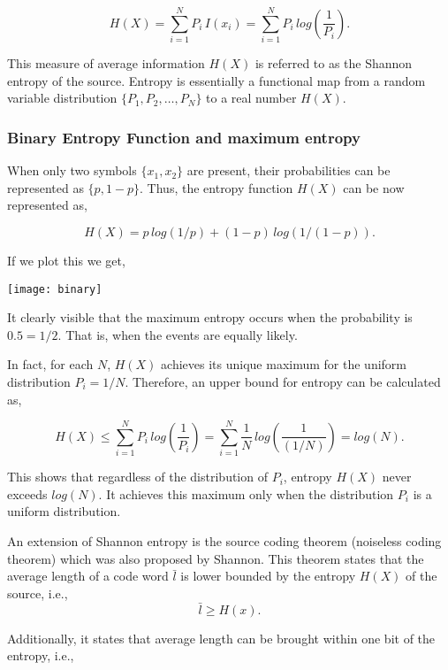 \documentclass[]{article}
\begin{document}
$$H(X) = \sum_{i=1}^{N}P_i\hspace{2pt}I(x_i) = \sum_{i=1}^{N}P_i\hspace{2pt}log\left(\frac{1}{P_i}\right). $$

This measure of average information $H(X)$ is referred to as the Shannon entropy of the source. Entropy is essentially a functional map from a random variable distribution $\{P_1,P_2,\dots,P_N\}$ to a real number $H(X)$. 

\subsubsection*{Binary Entropy Function and maximum entropy}

When only two symbols $\{x_1,x_2\}$ are present, their probabilities can be represented as $\{p,1-p\}$. Thus, the entropy function $H(X)$ can be now represented as,

$$H(X) = p\hspace{2pt}log(1/p)+(1-p)\hspace{2pt}log(1/(1-p)).$$

If we plot this we get,

\begin{center}
	\texttt{[image: binary]}
\end{center}

It clearly visible that the maximum entropy occurs when the probability is $0.5 =1/2.$ That is, when the events are equally likely. 

In fact, for each $N$, $H(X)$ achieves its unique maximum for the uniform distribution $P_i=1/N$. Therefore, an upper bound for entropy can be calculated as, 

$$H(X) \leq \sum_{i=1}^{N}P_i\hspace{2pt}log\left(\frac{1}{P_i}\right) = \sum_{i=1}^{N}\frac{1}{N}\hspace{2pt}log\left(\frac{1}{(1/N)}\right) = log(N).$$

This shows that regardless of the distribution of $P_i$, entropy $H(X)$ never exceeds $log(N)$. It achieves this maximum only when the distribution $P_i$ is a uniform distribution. 

An extension of Shannon entropy is the source coding theorem (noiseless coding theorem) which was also proposed by Shannon. This theorem states that the average length of a code word $\bar{l}$ is lower bounded by the entropy $H(X)$ of the source, i.e.,
$$\bar{l}\geq H(x).$$

Additionally, it states that average length can be brought within one bit of the entropy, i.e.,
\end{document}
